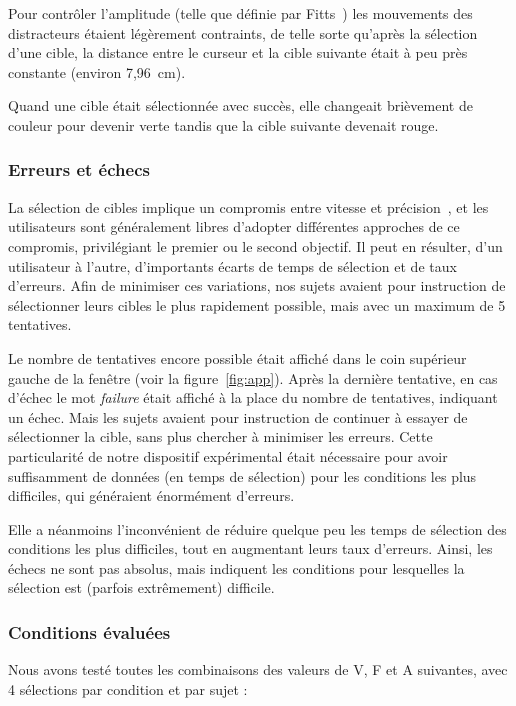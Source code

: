 	Pour contrôler l'amplitude (telle que définie par Fitts~\cite{fitts1954information}) les mouvements des distracteurs étaient légèrement contraints, de telle sorte qu'après la sélection d'une cible, la distance entre le curseur et la cible suivante était à peu près constante (environ 7,96~cm).
	
	Quand une cible était sélectionnée avec succès, elle changeait brièvement de couleur pour devenir verte tandis que la cible suivante devenait rouge.
	
	\subsubsection{Erreurs et échecs}
	La sélection de cibles implique un compromis entre vitesse et précision~\cite{guiard2011fitt}, et les utilisateurs sont généralement libres d'adopter différentes approches de ce compromis, privilégiant le premier ou le second objectif. Il peut en résulter, d'un utilisateur à l'autre, d'importants écarts de temps de sélection et de taux d'erreurs. Afin de minimiser ces variations, nos sujets avaient pour instruction de sélectionner leurs cibles le plus rapidement possible, mais avec un maximum de 5 tentatives.
	
	Le nombre de tentatives encore possible était affiché dans le coin supérieur gauche de la fenêtre (voir la figure~\ref{fig:app}). Après la dernière tentative, en cas d'échec le mot \emph{failure} était affiché à la place du nombre de tentatives, indiquant un échec. Mais les sujets avaient pour instruction de continuer à essayer de sélectionner la cible, sans plus chercher à minimiser les erreurs. Cette particularité de notre dispositif expérimental était nécessaire pour avoir suffisamment de données (en temps de sélection) pour les conditions les plus difficiles, qui généraient énormément d'erreurs.
	
	Elle a néanmoins l'inconvénient de réduire quelque peu les temps de sélection des conditions les plus difficiles, tout en augmentant leurs taux d'erreurs. Ainsi, les échecs ne sont pas absolus, mais indiquent les conditions pour lesquelles la sélection est (parfois extrêmement) difficile.
	
	\subsubsection{Conditions évaluées}
	Nous avons testé toutes les combinaisons des valeurs de V, F et A suivantes, avec 4 sélections par condition et par sujet :
	

